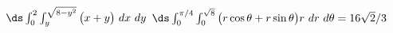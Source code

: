 {$\ds \int_{0}^{2}\int_{y}^{\sqrt{8-y^2}} \big(x+y\big)\ dx\ dy$
}
{$\ds \int_{0}^{\pi/4}\int_{0}^{\sqrt8} \big(r\cos\theta+r\sin\theta\big)r\ dr\ d\theta=16\sqrt2/3$
}